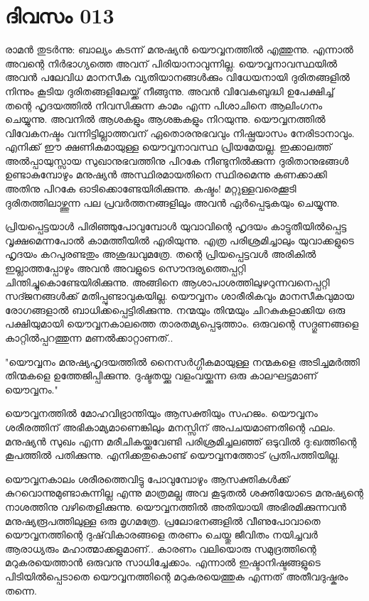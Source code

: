 \newpage
\section{ദിവസം 013}


രാമന്‍ തുടര്‍ന്നു: ബാല്യം കടന്ന് മനുഷ്യന്‍ യൌവ്വനത്തില്‍ എത്തുന്നു. എന്നാല്‍ അവന്റെ നിര്‍ഭാഗ്യത്തെ അവന്‌ പിരിയാനാവുന്നില്ല. യൌവ്വനാവസ്ഥയില്‍ അവന്‍ പലേവിധ മാനസീക വ്യതിയാനങ്ങള്‍ക്കും വിധേയനായി ദുരിതങ്ങളില്‍ നിന്നും കൂടിയ ദുരിതങ്ങളിലേയ്ക്ക്‌ നീങ്ങുന്നു. അവന്‍ വിവേകബുദ്ധി ഉപേക്ഷിച്ച്‌ തന്റെ ഹൃദയത്തില്‍ നിവസിക്കുന്ന കാമം എന്ന പിശാചിനെ ആലിംഗനം ചെയ്യുന്നു. അവനില്‍ ആശകളും ആശങ്കകളും നിറയുന്നു. യൌവ്വനത്തില്‍ വിവേകനഷ്ടം വന്നിട്ടില്ലാത്തവന്‌ ഏതൊരനുഭവവും നിഷ്പ്രയാസം നേരിടാനാവും. എനിക്ക്‌ ഈ ക്ഷണികമായുള്ള യൌവ്വനാവസ്ഥ പ്രിയമേയല്ല. ഇക്കാലത്ത്‌ അല്‍പ്പായുസ്സായ സുഖാനുഭവത്തിനു പിറകേ നീണ്ടുനില്‍ക്കുന്ന ദുരിതാനുഭങ്ങള്‍ ഉണ്ടാകുമ്പോഴും മനുഷ്യന്‍ അസ്ഥിരമായതിനെ സ്ഥിരമെന്നു കണക്കാക്കി അതിനു പിറകേ ഓടിക്കൊണ്ടേയിരിക്കുന്നു. കഷ്ടം! മറ്റുള്ളവരെക്കൂടി ദുരിതത്തിലാഴ്ത്തുന്ന പല പ്രവര്‍ത്തനങ്ങളിലും അവന്‍ ഏര്‍പ്പെടുകയും ചെയ്യുന്നു.

പ്രിയപ്പെട്ടയാള്‍ പിരിഞ്ഞുപോവുമ്പോള്‍ യുവാവിന്റെ ഹൃദയം കാട്ടുതീയില്‍പ്പെട്ട വൃക്ഷമെന്നപോല്‍ കാമത്തീയില്‍ എരിയുന്നു. എത്ര പരിശ്രമിച്ചാലും യുവാക്കളുടെ ഹൃദയം കറപുരണ്ടതും അശുദ്ധവുമത്രേ. തന്റെ പ്രിയപ്പെട്ടവള്‍ അരികില്‍ ഇല്ലാത്തപ്പോഴും അവന്‍ അവളുടെ സൌന്ദര്യത്തെപ്പറ്റി ചിന്തിച്ചുകൊണ്ടേയിരിക്കുന്നു. അങ്ങിനെ ആശാപാശത്തിലുഴറുന്നവനെപ്പറ്റി സദ്ജനങ്ങള്‍ക്ക്‌ മതിപ്പുണ്ടാവുകയില്ല. യൌവ്വനം ശാരീരികവും മാനസീകവുമായ രോഗങ്ങളാല്‍ ബാധിക്കപ്പെട്ടിരിക്കുന്നു. നന്മയും തിന്മയും ചിറകുകളാക്കിയ ഒരു പക്ഷിയുമായി യൌവ്വനകാലത്തെ താരതമ്യപ്പെടുത്താം. ഒരുവന്റെ സദ്ഗുണങ്ങളെ കാറ്റില്‍പ്പറത്തുന്ന മണല്‍ക്കാറ്റാണത്‌..

"യൌവ്വനം മനുഷ്യഹൃദയത്തില്‍ നൈസര്‍ഗ്ഗീകമായുള്ള നന്മകളെ അടിച്ചമര്‍ത്തി തിന്മകളെ ഉത്തേജിപ്പിക്കുന്നു. ദുഷ്ടതയ്ക്കു വളംവയ്ക്കുന്ന ഒരു കാലഘട്ടമാണ്‌ യൌവ്വനം."

യൌവ്വനത്തില്‍ മോഹവിഭ്രാന്തിയും ആസക്തിയും സഹജം. യൌവ്വനം ശരീരത്തിന്‌ അഭികാമ്യമാണെങ്കിലും മനസ്സിന്‌ അപചയമാണതിന്റെ ഫലം. മനുഷ്യന്‍ സുഖം എന്ന മരീചികയ്ക്കുവേണ്ടി പരിശ്രമിച്ചലഞ്ഞ്‌ ഒടുവില്‍ ദു:ഖത്തിന്റെ കൂപത്തില്‍ പതിക്കുന്നു. എനിക്കതുകൊണ്ട്‌ യൌവ്വനത്തോട്‌ പ്രതിപത്തിയില്ല. 

യൌവ്വനകാലം ശരീരത്തെവിട്ടു പോവുമ്പോഴും ആസക്തികള്‍ക്ക്‌ കുറവൊന്നുമുണ്ടാകുന്നില്ല എന്നു മാത്രമല്ല അവ കൂടുതല്‍ ശക്തിയോടെ മനുഷ്യന്റെ നാശത്തിനു വഴിതെളിക്കുന്നു. യൌവ്വനത്തില്‍ അതിയായി അഭിരമിക്കുന്നവന്‍ മനുഷ്യരൂപത്തിലുള്ള ഒരു മൃഗമത്രേ. പ്രലോഭനങ്ങളില്‍ വീണുപോവാതെ യൌവ്വനത്തിന്റെ ദുഷ്‌വികാരങ്ങളെ തരണം ചെയ്തു ജീവിതം നയിച്ചവര്‍ ആരാധ്യരും മഹാത്മാക്കളുമാണ്‌.. കാരണം വലിയൊരു സമുദ്രത്തിന്റെ മറുകരയെത്താന്‍ ഒരുവനു സാധിച്ചേക്കാം. എന്നാല്‍ ഇഷ്ടാനിഷ്ടങ്ങളുടെ പിടിയില്‍പ്പെടാതെ യൌവ്വനത്തിന്റെ മറുകരയെത്തുക എന്നത്‌ അതീവദുഷ്കരം തന്നെ.

